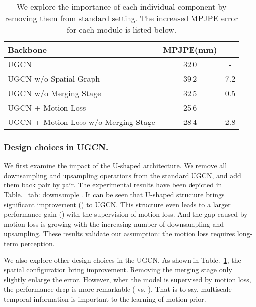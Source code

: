 \documentclass[runningheads]{llncs}
\begin{document}
\begin{table}[htb]
    \scriptsize
    \setlength{\tabcolsep}{0.39em}
    \centering
    \caption {We explore the importance of each individual component by removing them from standard setting.
        The increased MPJPE error for each module is listed below.}
    \label{tab: graph and merge}
    \begin{tabular}{@{}lcc@{}}
    \toprule
    Backbone    &  MPJPE(mm)&  \\
    \midrule
    UGCN & 32.0 & - \\
    UGCN w/o Spatial Graph  & 39.2 &  7.2\\
    UGCN w/o Merging Stage  &32.5 & 0.5 \\
    \midrule
    UGCN                  + Motion Loss  & 25.6 & - \\
    UGCN + Motion Loss w/o Merging Stage   & 28.4 & 2.8 \\
    \bottomrule
    \end{tabular}
\end{table}


\subsubsection{Design choices in UGCN.}
We first examine the impact of the U-shaped architecture.
We remove all downsampling and upsampling operations from the standard UGCN,
and add them back pair by pair.
The experimental results have been depicted in Table.~\ref{tab: downsample}.
It can be seen that U-shaped structure brings significant improvement () to UGCN.
This structure even leads to a larger performance gain () with the supervision of motion loss.
And the gap caused by motion loss is growing with the increasing number of downsampling and upsampling.
These results validate our assumption: the motion loss requires long-term perception.

We also explore other design choices in the UGCN. As shown in Table.~\ref{tab: graph and merge},
the spatial configuration bring  improvement.
Removing the merging stage only slightly enlarge the error.
However, when the model is supervised by motion loss, the performance drop is more remarkable ( vs. ).
That is to say, multiscale temporal information is important to the learning of motion prior.
\end{document}
